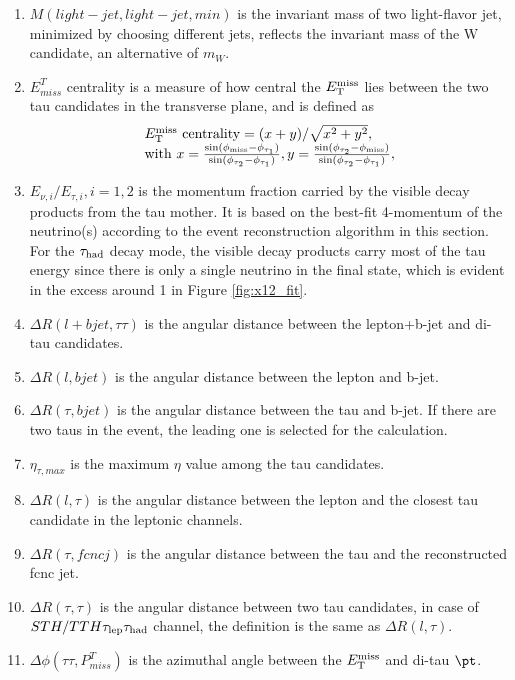 \begin{enumerate}
\item $M(light-jet,light-jet,min)$ is the invariant mass of two light-flavor jet, minimized by choosing different jets, reflects the invariant mass of the W candidate, an alternative of $m_{W}$.
\item $E^{T}_{miss}$ centrality is a measure of how central the $E_{\text{T}}^{\text{miss}}$ lies between the two tau candidates in the transverse plane, and is defined as
\begin{eqnarray}
\begin{array}{l}
E_{\text{T}}^{\text{miss}}~\text{centrality} = {(x+y)}/{\sqrt{x^2+y^2}}, \\
\text{with}~x=\frac{\sin(\phi_{\text{miss}}-\phi_{\tau_1})}{\sin(\phi_{\tau_2}-\phi_{\tau_1})},  y=\frac{\sin(\phi_{\tau_2}-\phi_{\text{miss}})}{\sin(\phi_{\tau_2}-\phi_{\tau_1})} ,
\end{array}
\label{eq:eq3}
\end{eqnarray}
\item $E_{\nu,i}/E_{\tau,i},i=1,2$ is the momentum fraction carried by the visible decay products from the tau mother. It is based on the best-fit 4-momentum of the neutrino(s) according to the event reconstruction algorithm in this section. For the $\tau_\text{had}$ decay mode, the visible decay products carry most of the tau energy since there is only a single neutrino in the final state, which is evident in the excess around 1 in Figure \ref{fig:x12_fit}. 
\item $\Delta R(l+bjet,\tau\tau)$ is the angular distance between the lepton+b-jet and di-tau candidates.
\item $\Delta R(l,bjet)$ is the angular distance between the lepton and b-jet.
\item $\Delta R(\tau,bjet)$ is the angular distance between the tau and b-jet. If there are two taus in the event, the leading one is selected for the calculation.
\item $\eta_{\tau,max}$ is the maximum $\eta$ value among the tau candidates.
\item $\Delta R(l,\tau)$ is the angular distance between the lepton and the closest tau candidate in the leptonic channels.
\item $\Delta R(\tau,fcncj)$ is the angular distance between the tau and the reconstructed fcnc jet.
\item $\Delta R(\tau,\tau)$ is the angular distance between two tau candidates, in case of $STH/TTH \tau_\text{lep}{}\tau_\text{had}$ channel, the definition is the same as $\Delta R(l,\tau)$.
\item $\Delta\phi(\tau\tau,P^{T}_{miss})$ is the azimuthal angle between the $E_{\text{T}}^{\text{miss}}$ and di-tau $\pt$.


\end{enumerate}
